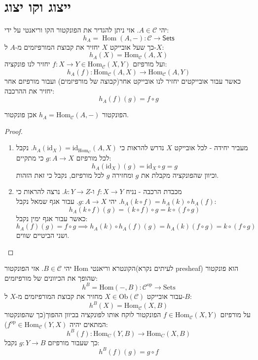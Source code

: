 \documentclass{tstextbook}
\begin{document}
\section{ייצוג וקו יצוג}

\begin{definition}
יהי \(A \in \mathcal{C}\). אזי ניתן להגדיר את הפונקטור הקו וריאנטי על ידי:
$$h_{A}=\operatorname{Hom}(A,-)\colon{\mathcal{C}}\to\mathsf{Sets}$$
כך שעל אובייקט \(X\) יחזיר את קבוצת המורפיזמים מ-\(A\) ל-\(X\):
$$h_{A}(X)=\mathrm{Hom}_{\mathcal{C} }(A,X)$$
ועל מורפיזם \(f:X\to Y\in \mathrm{Hom}_{\mathcal{C}}(X,Y)\) יחזיר לנו פונקציה:
$$h_{A}(f):\mathrm{Hom}_{\mathcal{C} }(A,X)\to \mathrm{Hom}_{\mathcal{C} }(A,Y)$$
כאשר עבור אובייקטים יחזיר לנו אובייקט אחר(קבוצה של מורפיזמים) ועבור מורפיזם אחר יחזיר את ההרכבה:
$$h_{A}(f)(g)=f\circ g$$

\end{definition}
\begin{proposition}
הפונקטור \(h_{A}=\mathrm{Hom}_{\mathcal{C}}(A,-)\) אכן פונקטור.

\end{proposition}
\begin{proof}
  \begin{enumerate}
    \item מעביר יחידה - לכל אובייקט \(X\) נדרש להראות כי \(h_{A}(\mathrm{id}_{X})=\mathrm{id}_{\mathrm{Hom}_{C}}(A,X)\). נקבל לכל מורפיזם \(g:A\to X\) כי מתקיים: 
$$h_{A}(\mathrm{id}_{X})(g)=\mathrm{id}_{X}\circ g=g$$
וכיוון שהפונקציה מקבלת את \(g\) ומחזירה \(g\) לכל מורפיזם, נקבל כי זאת הזהות.


    \item מכבדת הרכבה - נניח \(f:X\to Y\) ו-\(k:Y\to Z\). נרצה להראות כי \(h_{A}(k\circ f)=h_{A}(k)\circ h_{A}(f)\). יהי \(g:A\to X\). עבור אגף שמאל נקבל: 
$$h_{A}\left( k\circ f \right)(g)=\left( k\circ f \right)\circ g=k\circ \left( f\circ  g \right)$$
כאשר עבור אגף ימין נקבל:
$$h_{A}(f)(g)=f\circ g\implies h_{A}(k)\circ h_{A}(f)(g)=h_{A}(k)\left( f\circ g \right)=k\circ \left( f\circ g \right)$$
ושני הביטיים שווים.


  \end{enumerate}
\end{proof}
\begin{definition}
יהי \(B \in \mathcal{C}\). אזי הפונקטור Hom הקונטרא וריאנטי(לעיתים נקרא presheaf) הוא פונקטור שהופך את הכיוונים של מורפיזמים:
$$h^{B}=\mathrm{Hom}(-,B)\colon{\mathcal C}^{\mathrm{op}}\to\mathrm{Sets}$$
עבור אובייקט \(X \in \mathrm{Ob}\left( \mathcal{C} \right)\) מחזיר את קבוצת המורפיזמים מ-\(X\) ל-\(B\):
$${h^{B}}(X)=\mathrm{Hom}_{\mathcal{C}}(X,B)$$
על מורפיזם \(f\in \mathrm{Hom}_{\mathcal{C}}(X,Y)\) הפונקטור לוקח אותו לפונקציה בכיוון ההפוך(כך שהפונקטור המתאים יהיה \(f^{\text{op}}\in \mathrm{Hom}_{\mathcal{C}}(Y,X)\)):
$${h^{B}}(f):{\mathrm{Hom}}_{C}(Y,B)\to{\mathrm{Hom}}_{C}(X,B)$$
כך שעבור מורפיזם \(g:Y\to B\) נקבל:
$$h^{B}(f)(g)=g\circ f$$

\end{definition}
\end{document}
